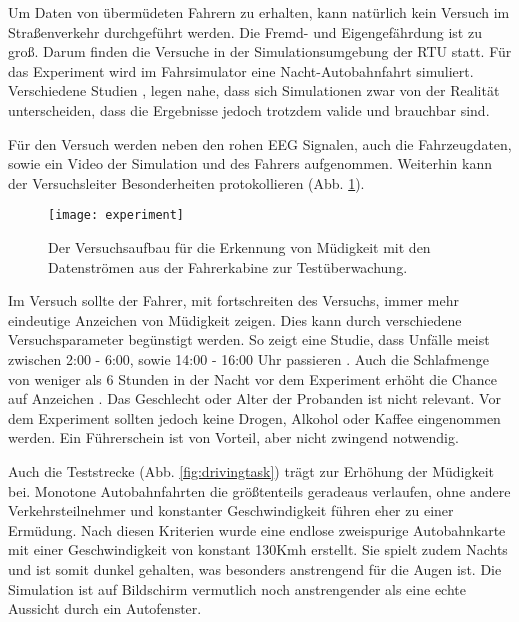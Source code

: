 \label{chap:data}
Um Daten von übermüdeten Fahrern zu erhalten, kann natürlich kein Versuch im Straßenverkehr durchgeführt werden. Die Fremd- und Eigengefährdung ist zu groß. Darum finden die Versuche in der Simulationsumgebung der \acl{RTU} statt. Für das Experiment wird im Fahrsimulator eine Nacht-Autobahnfahrt simuliert. Verschiedene Studien \cite{Engstrom_2322937}, \cite{Horne_1757738} legen nahe, dass sich Simulationen zwar von der Realität unterscheiden, dass  die Ergebnisse jedoch trotzdem valide und brauchbar sind.

Für den Versuch werden neben den rohen EEG Signalen, auch die Fahrzeugdaten, sowie ein Video der Simulation und des Fahrers aufgenommen. Weiterhin kann der Versuchsleiter Besonderheiten protokollieren (Abb. \ref{fig:experiment}).

\begin{figure}[h] 
  \begin{center}
    \texttt{[image: experiment]}
    \caption[Versuchsaufbau Experiment]{Der Versuchsaufbau für die Erkennung von Müdigkeit mit den Datenströmen aus der Fahrerkabine zur Testüberwachung. \label{fig:experiment}}
  \end{center}
\end{figure}

Im Versuch sollte der Fahrer, mit fortschreiten des Versuchs, immer mehr eindeutige Anzeichen von Müdigkeit zeigen. Dies kann durch verschiedene Versuchsparameter begünstigt werden. So zeigt eine Studie, dass Unfälle meist zwischen 2:00 - 6:00, sowie 14:00 - 16:00 Uhr passieren \cite{Horne_1757738}. Auch die Schlafmenge von weniger als 6 Stunden in der Nacht vor dem Experiment erhöht die Chance auf Anzeichen \cite{Engstrom_2322937}. Das Geschlecht oder Alter der Probanden ist nicht relevant. Vor dem Experiment sollten jedoch keine Drogen, Alkohol oder Kaffee eingenommen werden. Ein Führerschein ist von Vorteil, aber nicht zwingend notwendig.

Auch die Teststrecke (Abb. \ref{fig:drivingtask}) trägt zur Erhöhung der Müdigkeit bei. Monotone Autobahnfahrten die größtenteils geradeaus verlaufen, ohne andere Verkehrsteilnehmer und konstanter Geschwindigkeit führen eher zu einer Ermüdung. Nach diesen Kriterien wurde eine endlose zweispurige Autobahnkarte mit einer Geschwindigkeit von konstant 130Kmh erstellt. Sie spielt zudem Nachts und ist somit dunkel gehalten, was besonders anstrengend für die Augen ist. Die Simulation ist auf Bildschirm vermutlich noch anstrengender als eine echte Aussicht durch ein Autofenster.

